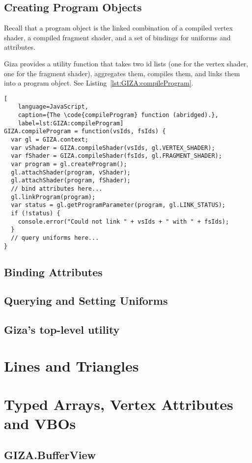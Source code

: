 \subsection{Creating Program Objects}

Recall that a  program object is the linked combination of a compiled vertex shader, a compiled fragment shader, and a set of bindings for uniforms and attributes.

Giza provides a utility function that takes two id lists (one for the vertex shader, one for the fragment shader), aggregates them, compiles them, and links them into a program object.  See Listing~\ref{lst:GIZA:compileProgram}.

\begin{lstlisting}[
    language=JavaScript,
    caption={The \code{compileProgram} function (abridged).},
    label=lst:GIZA:compileProgram]
GIZA.compileProgram = function(vsIds, fsIds) {
  var gl = GIZA.context;
  var vShader = GIZA.compileShader(vsIds, gl.VERTEX_SHADER);
  var fShader = GIZA.compileShader(fsIds, gl.FRAGMENT_SHADER);
  var program = gl.createProgram();
  gl.attachShader(program, vShader);
  gl.attachShader(program, fShader);
  // bind attributes here...
  gl.linkProgram(program);
  var status = gl.getProgramParameter(program, gl.LINK_STATUS);
  if (!status) {
    console.error("Could not link " + vsIds + " with " + fsIds);
  }
  // query uniforms here...
}
\end{lstlisting}

\subsection{Binding Attributes}

\subsection{Querying and Setting Uniforms}

\subsection{Giza's top-level  utility}

\section{Lines and Triangles}

\section{Typed Arrays, Vertex Attributes and VBOs}

\subsection{GIZA.BufferView}


